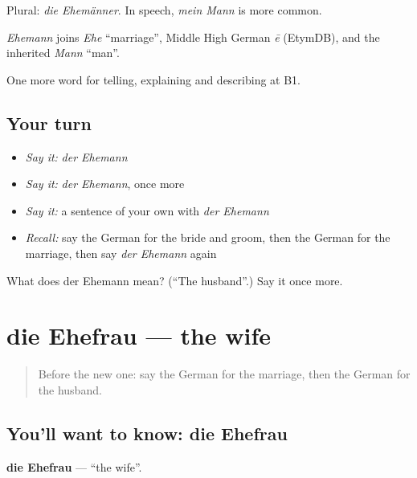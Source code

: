 Plural: \emph{die Ehemänner}. In speech, \emph{mein Mann} is more common.

\begin{cousinweb}
\emph{Ehemann} joins \emph{Ehe} \textquotedblleft{}marriage\textquotedblright{}, Middle High German \emph{ē} (EtymDB), and the inherited \emph{Mann} \textquotedblleft{}man\textquotedblright{}.
\end{cousinweb}

\begin{grammarlens}[title={What you've built}]
One more word for telling, explaining and describing at B1.
\end{grammarlens}

\subsection*{Your turn}
\begin{itemize}
\raggedright
  \item \emph{Say it:} \emph{der Ehemann}
  \item \emph{Say it:} \emph{der Ehemann}, once more
  \item \emph{Say it:} a sentence of your own with \emph{der Ehemann}
  \item \emph{Recall:} say the German for the bride and groom, then the German for the marriage, then say \emph{der Ehemann} again
\end{itemize}

\begin{tcolorbox}[breakable,colback=teal!4,colframe=teal!35!black,title={Before you move on}]
What does der Ehemann mean? (\textquotedblleft{}The husband\textquotedblright{}.) Say it once more.
\end{tcolorbox}
\section[die Ehefrau]{die Ehefrau — the wife}

\label{lesson:GE-C299-ehefrau}



\begin{quote}
Before the new one: say the German for the marriage, then the German for the husband.
\end{quote}

\subsection*{You'll want to know: die Ehefrau}
\textbf{die Ehefrau} — \textquotedblleft{}the wife\textquotedblright{}.

